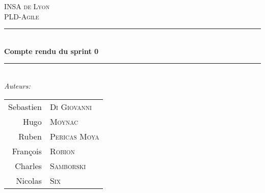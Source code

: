 \newcommand{\HRule}{\rule{\linewidth}{0.5mm}} %

  \center %
   

  \textsc{\LARGE INSA de Lyon}\\[1.5cm] %
  \textsc{\Large PLD-Agile}\\[0.5cm] %


  \HRule \\[0.4cm]
  { \huge \bfseries Compte rendu du sprint 0}\\[0.4cm] %
  \HRule \\[1.5cm]
   

  \Large \emph{Auteurs:}\\[1cm]
  \begin{table}[h]
    \begin{center}
      \begin{tabular}{r l}
         Sebastien & \textsc{Di Giovanni} \\
         Hugo & \textsc{Moynac} \\
         Ruben & \textsc{Pericas Moya} \\
         François & \textsc{Robion} \\
         Charles & \textsc{Samborski} \\
         Nicolas & \textsc{Six} \\[3cm]
      \end{tabular}
    \end{center}
  \end{table}
  
